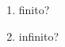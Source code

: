 \documentclass{article}
\begin{document}
\begin{enumerate}
    \begin{enumerate}
    \item finito?
    
    \item infinito?
    \end{enumerate}
\end{enumerate}
\end{document}
